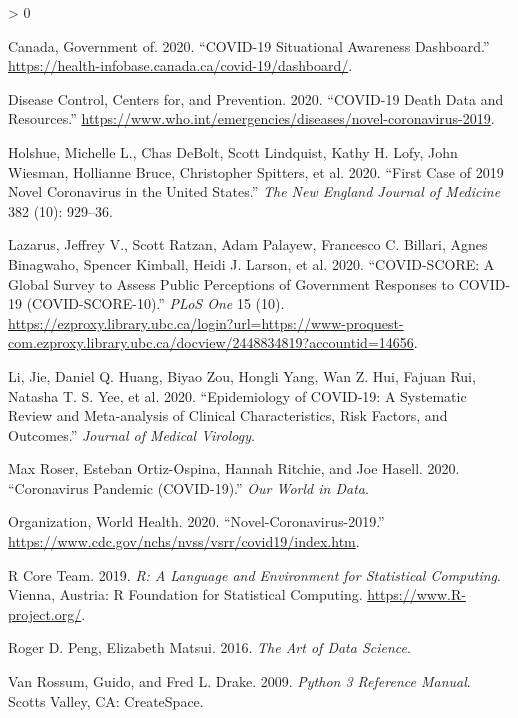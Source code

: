\documentclass[
]{article}
\newlength{\cslhangindent}
\newenvironment{CSLReferences}[2] %
 {%
  \setlength{\parindent}{0pt}
  \ifodd #1 \everypar{\setlength{\hangindent}{\cslhangindent}}\ignorespaces\fi
  \ifnum #2 > 0
  \setlength{\parskip}{#2\baselineskip}
  \fi
 }%
 {}
\begin{document}
\hypertarget{refs}{}
\begin{CSLReferences}{1}{0}
\leavevmode\hypertarget{ref-govCA}{}%
Canada, Government of. 2020. {``COVID-19 Situational Awareness
Dashboard.''}
\url{https://health-infobase.canada.ca/covid-19/dashboard/}.

\leavevmode\hypertarget{ref-cdc}{}%
Disease Control, Centers for, and Prevention. 2020. {``COVID-19 Death
Data and Resources.''}
\url{https://www.who.int/emergencies/diseases/novel-coronavirus-2019}.

\leavevmode\hypertarget{ref-first-case}{}%
Holshue, Michelle L., Chas DeBolt, Scott Lindquist, Kathy H. Lofy, John
Wiesman, Hollianne Bruce, Christopher Spitters, et al. 2020. {``First
Case of 2019 Novel Coronavirus in the United States.''} \emph{The New
England Journal of Medicine} 382 (10): 929--36.

\leavevmode\hypertarget{ref-covid-score}{}%
Lazarus, Jeffrey V., Scott Ratzan, Adam Palayew, Francesco C. Billari,
Agnes Binagwaho, Spencer Kimball, Heidi J. Larson, et al. 2020.
{``COVID-SCORE: A Global Survey to Assess Public Perceptions of
Government Responses to COVID-19 (COVID-SCORE-10).''} \emph{PLoS One} 15
(10).
\url{https://ezproxy.library.ubc.ca/login?url=https://www-proquest-com.ezproxy.library.ubc.ca/docview/2448834819?accountid=14656}.

\leavevmode\hypertarget{ref-epidemiology}{}%
Li, Jie, Daniel Q. Huang, Biyao Zou, Hongli Yang, Wan Z. Hui, Fajuan
Rui, Natasha T. S. Yee, et al. 2020. {``Epidemiology of COVID‐19: A
Systematic Review and Meta‐analysis of Clinical Characteristics, Risk
Factors, and Outcomes.''} \emph{Journal of Medical Virology}.

\leavevmode\hypertarget{ref-owidcoronavirus}{}%
Max Roser, Esteban Ortiz-Ospina, Hannah Ritchie, and Joe Hasell. 2020.
{``Coronavirus Pandemic (COVID-19).''} \emph{Our World in Data}.

\leavevmode\hypertarget{ref-who}{}%
Organization, World Health. 2020. {``Novel-Coronavirus-2019.''}
\url{https://www.cdc.gov/nchs/nvss/vsrr/covid19/index.htm}.

\leavevmode\hypertarget{ref-R}{}%
R Core Team. 2019. \emph{R: A Language and Environment for Statistical
Computing}. Vienna, Austria: R Foundation for Statistical Computing.
\url{https://www.R-project.org/}.

\leavevmode\hypertarget{ref-aods}{}%
Roger D. Peng, Elizabeth Matsui. 2016. \emph{The Art of Data Science}.

\leavevmode\hypertarget{ref-Python}{}%
Van Rossum, Guido, and Fred L. Drake. 2009. \emph{Python 3 Reference
Manual}. Scotts Valley, CA: CreateSpace.

\end{CSLReferences}
\end{document}
